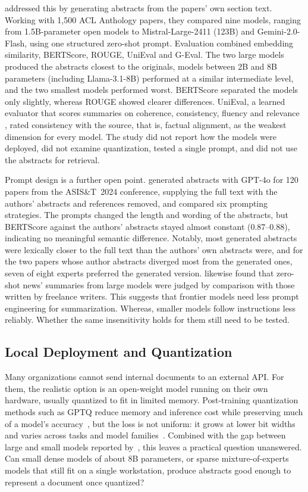 \documentclass[bdcc,article,submit,pdftex,moreauthors]{Definitions/mdpi}
\begin{document}
\citet{bektacs2025academic} addressed this by generating abstracts from the papers’ own section text. Working with 1,500 ACL Anthology papers, they compared nine models, ranging from 1.5B-parameter open models to Mistral-Large-2411 (123B) and Gemini-2.0-Flash, using one structured zero-shot prompt. Evaluation combined embedding similarity, BERTScore, ROUGE, UniEval and G-Eval. The two large models produced the abstracts closest to the originals, models between 2B and 8B parameters (including Llama-3.1-8B) performed at a similar intermediate level, and the two smallest models performed worst. BERTScore separated the models only slightly, whereas ROUGE showed clearer differences. UniEval, a learned evaluator that scores summaries on coherence, consistency, fluency and relevance \citet{zhong2022towards}, rated consistency with the source, that is, factual alignment, as the weakest dimension for every model. The study did not report how the models were deployed, did not examine quantization, tested a single prompt, and did not use the abstracts for retrieval.

Prompt design is a further open point. \citet{kim2025exploring} generated abstracts with GPT-4o for 120 papers from the ASIS\&T~2024 conference, supplying the full text with the authors' abstracts and references removed, and compared six prompting strategies. The prompts changed the length and wording of the abstracts, but BERTScore against the authors' abstracts stayed almost constant (0.87--0.88), indicating no meaningful semantic difference. Notably, most generated abstracts were lexically closer to the full text than the authors' own abstracts were, and for the two papers whose author abstracts diverged most from the generated ones, seven of eight experts preferred the generated version. 
\citet{zhang-etal-2024-benchmarking} likewise found that zero-shot news' summaries from large models were judged by comparison with those written by freelance writers.
This suggests that frontier models need less prompt engineering for summarization. Whereas, smaller models follow instructions less reliably. 
Whether the same insensitivity holds for them still need to be tested.

\subsection{Local Deployment and Quantization}

Many organizations cannot send internal documents to an external API. For them, the realistic option is an open-weight model running on their own hardware, usually quantized to fit in limited memory. Post-training quantization methods such as GPTQ reduce memory and inference cost while preserving much of a model's accuracy~\citep{frantar2022gptq}, but the loss is not uniform: it grows at lower bit widths and varies across tasks and model families~\citep{jin2024comprehensive}. Combined with the gap between large and small models reported by~\citet{bektacs2025academic}, this leaves a practical question unanswered. Can small dense models of about 8B parameters, or sparse mixture-of-experts models that still fit on a single workstation, produce abstracts good enough to represent a document once quantized?
\end{document}
